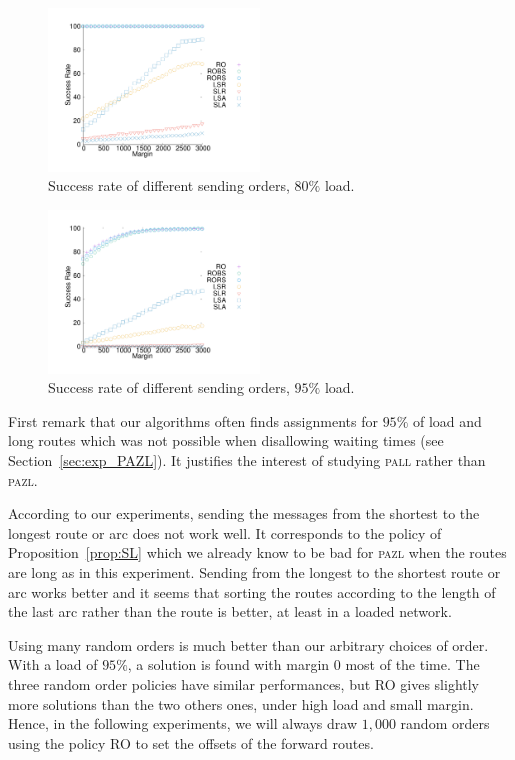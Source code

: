 \documentclass[10pt, conference, letterpaper]{IEEEtran}
\newcommand\pazl{\textsc{pazl}\xspace}
\newcommand\pall{\textsc{pall}\xspace}
\begin{document}
\begin{figure}[h] 
  \centering
          \includegraphics[width=0.5\textwidth]{departs_gp_25000.pdf}
      \caption{Success rate of different sending orders, $80\%$ load.}
           \label{fig:success80}
     \end{figure}
     
\begin{figure}[h] 
  \centering
    \includegraphics[width=0.5\textwidth]{departs_gp_21000.pdf}
      \caption{Success rate of different sending orders, $95\%$ load.}
      \label{fig:success95}
          \end{figure}

     First remark that our algorithms often finds assignments for $95\%$ of load and long routes which was not possible 
     when disallowing waiting times (see Section~\ref{sec:exp_PAZL}). It justifies the interest of studying \pall rather than \pazl.
          
     According to our experiments, sending the messages from the shortest to the longest route or arc does not work well. It corresponds to the policy of Proposition~\ref{prop:SL} which we already know to be bad for \pazl when the routes are long as in this experiment. Sending from the longest to the shortest route or arc works better and it seems that sorting the routes according to the length of the last arc rather than the route is better, at least in a loaded network. 
     
     Using many random orders is much better than our arbitrary choices of order. With a load of $95\%$, a solution is found with margin $0$ most of the time. The three random order policies have similar performances, but RO gives slightly more solutions than the two others ones, under high load and small margin. Hence, in the following experiments, we will always draw $1,000$ random orders using the policy RO to set the offsets of the forward routes.
     
\end{document}

